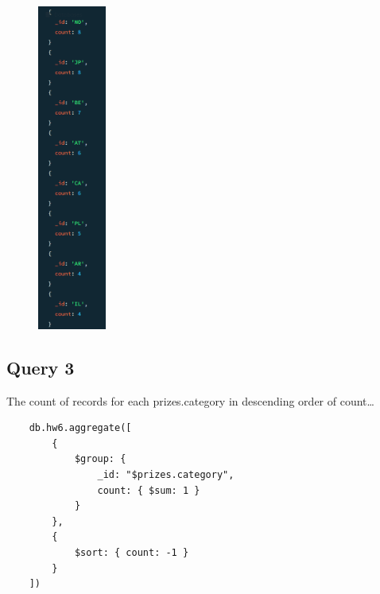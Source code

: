 \documentclass{article}
\begin{document}
\begin{multicols*}{3}
    \columnbreak

    \begin{figure}[H]
        \includegraphics[width=0.2\textwidth]{images/q2c.png}
    \end{figure}
\end{multicols*}

\subsection{Query 3}
The count of records for each prizes.category in descending order of count\dots

\begin{verbatim}
    db.hw6.aggregate([
        {
            $group: {
                _id: "$prizes.category",
                count: { $sum: 1 }
            }
        },
        {
            $sort: { count: -1 }
        }
    ])
\end{verbatim}
\end{document}
